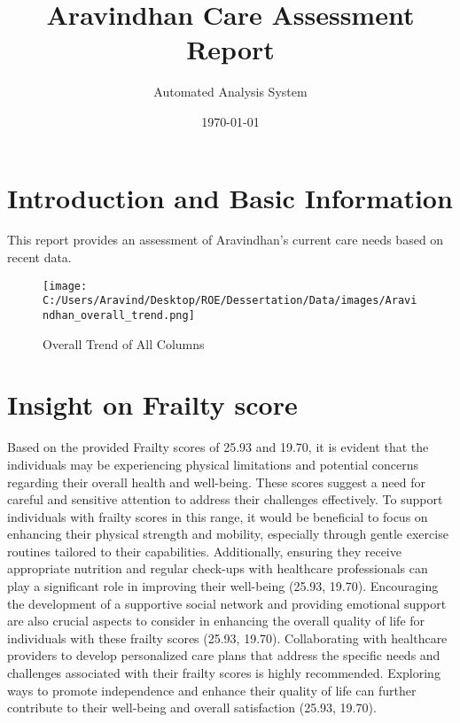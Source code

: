 \documentclass[10pt, a4paper]{article}%
\title{Aravindhan Care Assessment Report}%
\author{Automated Analysis System}%
\date{\today}%
\begin{document}
%
\normalsize%
\maketitle%
\section{Introduction and Basic Information}%
\label{sec:IntroductionandBasicInformation}%
This report provides an assessment of Aravindhan's current care needs based on recent data.%


\begin{figure}[H]%
\centering%
\texttt{[image: C:/Users/Aravind/Desktop/ROE/Dessertation/Data/images/Aravindhan\_overall\_trend.png]}%
\caption{Overall Trend of All Columns}%
\end{figure}

%
\section{Insight on Frailty score}%
\label{sec:InsightonFrailtyscore}%
Based on the provided Frailty scores of 25.93 and 19.70, it is evident that the individuals may be experiencing physical limitations and potential concerns regarding their overall health and well{-}being. These scores suggest a need for careful and sensitive attention to address their challenges effectively.\newline%
\newline%
To support individuals with frailty scores in this range, it would be beneficial to focus on enhancing their physical strength and mobility, especially through gentle exercise routines tailored to their capabilities. Additionally, ensuring they receive appropriate nutrition and regular check{-}ups with healthcare professionals can play a significant role in improving their well{-}being (25.93, 19.70).\newline%
\newline%
Encouraging the development of a supportive social network and providing emotional support are also crucial aspects to consider in enhancing the overall quality of life for individuals with these frailty scores (25.93, 19.70).\newline%
\newline%
Collaborating with healthcare providers to develop personalized care plans that address the specific needs and challenges associated with their frailty scores is highly recommended. Exploring ways to promote independence and enhance their quality of life can further contribute to their well{-}being and overall satisfaction (25.93, 19.70).%
\end{document}
